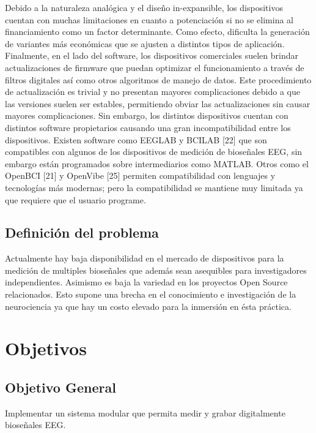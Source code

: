 Debido a la naturaleza analógica y el diseño in-expansible, los dispositivos cuentan con muchas limitaciones en cuanto a potenciación si no se elimina al financiamiento como un factor determinante. Como efecto, dificulta la generación de variantes más económicas que se ajusten a distintos tipos de aplicación.\\

Finalmente, en el lado del software, los dispositivos comerciales suelen brindar actualizaciones de firmware que puedan optimizar el funcionamiento a través de filtros digitales así como otros algoritmos de manejo de datos. Este procedimiento de actualización es trivial y no presentan mayores complicaciones debido a que las versiones suelen ser estables, permitiendo obviar las actualizaciones sin causar mayores complicaciones. Sin embargo, los distintos dispositivos cuentan con distintos software propietarios causando una gran incompatibilidad entre los dispositivos. Existen software como EEGLAB y BCILAB [22] que son compatibles con algunos de los dispositivos de medición de bioseñales EEG, sin embargo están programados sobre intermediarios como MATLAB. Otros como el OpenBCI [21] y OpenVibe [25] permiten compatibilidad con lenguajes y tecnologías más modernas; pero la compatibilidad se mantiene muy limitada ya que requiere que el usuario programe.\\

\subsection{Definición del problema}
\label{sec:orgd89525e}
Actualmente hay baja disponibilidad en el mercado de dispositivos para la medición de multiples bioseñales que además sean asequibles para investigadores independientes. Asimismo es baja la variedad en los proyectos Open Source relacionados. Esto supone una brecha en el conocimiento e investigación de la neurociencia ya que hay un costo elevado para la inmersión en ésta práctica.\\

\section{Objetivos}
\label{sec:orge9abfe6}
\subsection{Objetivo General}
\label{sec:org82460ed}
Implementar un sistema modular que permita medir y grabar digitalmente bioseñales EEG.\\


